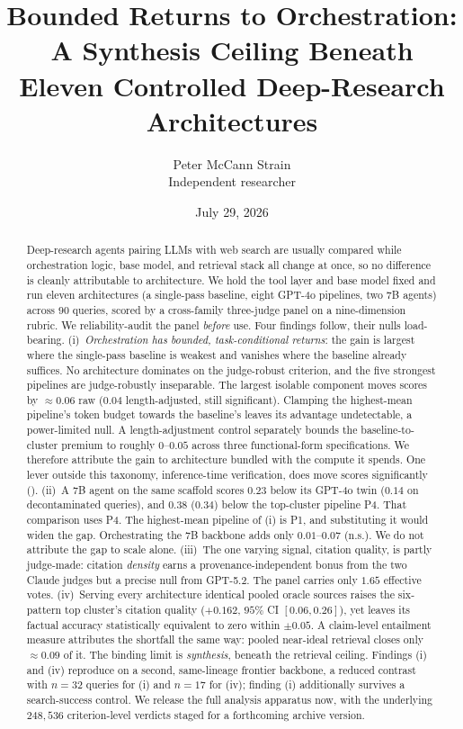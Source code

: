 \documentclass[11pt]{article}
\title{\bfseries Bounded Returns to Orchestration:\\[2pt]
\large A Synthesis Ceiling Beneath Eleven Controlled Deep-Research Architectures}
\author{Peter McCann Strain\\
\normalsize Independent researcher}
\date{July 29, 2026}
\begin{document}
\maketitle

\begin{abstract}
\noindent
Deep-research agents pairing LLMs with web search are usually
compared while orchestration logic, base model, and retrieval stack all change at
once, so no difference is cleanly attributable to architecture. We hold the
tool layer and base model fixed and run eleven architectures (a single-pass baseline,
eight GPT-4o pipelines, two 7B agents) across $90$ queries, scored by a
cross-family three-judge panel on a nine-dimension rubric. We reliability-audit
the panel \emph{before} use. Four findings follow, their nulls load-bearing.
(i)~\emph{Orchestration has bounded, task-conditional returns}: the gain is
largest where the single-pass baseline is weakest and vanishes where the baseline
already suffices. No architecture dominates on the judge-robust criterion, and the
five strongest pipelines are judge-robustly inseparable. The largest isolable
component moves scores by $\approx\!0.06$ raw ($0.04$ length-adjusted, still
significant). Clamping the highest-mean
pipeline's token budget towards the baseline's leaves its advantage undetectable,
a power-limited null. A length-adjustment control separately bounds the baseline-to-cluster
premium to roughly $0$--$0.05$ across three functional-form specifications. We
therefore attribute the gain to architecture bundled with the compute it spends.
One lever outside this taxonomy,
inference-time verification, does move
scores significantly ().
(ii)~A 7B agent on the same scaffold scores $0.23$ below its GPT-4o twin ($0.14$
on decontaminated queries), and $0.38$
($0.34$) below the top-cluster pipeline P4. That comparison uses P4. The highest-mean
pipeline of (i) is P1, and substituting it would widen the gap. Orchestrating the 7B backbone adds only
$0.01$--$0.07$ (n.s.). We do
not attribute the gap to scale alone. (iii)~The one varying signal, citation quality,
is partly judge-made: citation \emph{density} earns a provenance-independent bonus
from the two Claude judges but a precise null from GPT-5.2. The panel carries only
$1.65$ effective votes. (iv)~Serving every architecture identical pooled oracle
sources raises the six-pattern top cluster's citation quality ($+0.162$, $95\%$ CI $[0.06,0.26]$),
yet leaves its factual accuracy statistically equivalent to zero within $\pm0.05$. A claim-level
entailment measure attributes the shortfall the same way: pooled near-ideal retrieval
closes only $\approx\!0.09$ of it. The binding limit is \emph{synthesis}, beneath the retrieval
ceiling. Findings (i) and (iv) reproduce on a second, same-lineage frontier backbone,
a reduced contrast with $n{=}32$ queries for (i) and $n{=}17$ for (iv); finding (i)
additionally survives a search-success
control. We release the full
analysis apparatus now, with the underlying $248{,}536$ criterion-level verdicts staged for a
forthcoming archive version.
\end{abstract}
\end{document}
